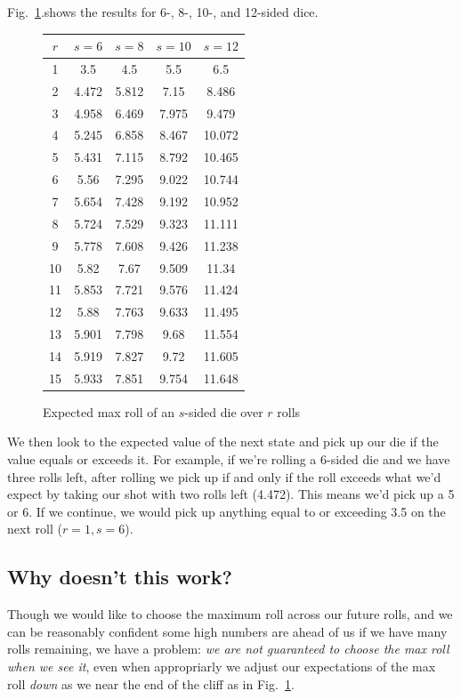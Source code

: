 \documentclass[11pt, oneside]{article} 	%
\begin{document}
 Fig.~\ref{fig:max-rolls}.shows the results for 6-, 8-, 10-, and 12-sided dice.

\begin{figure}[!htb]
\centering
\begin{tabular}{c | c c c c}
$r$ & $s=6$ & $s=8$  & $s=10$ & $s=12$  \\
\hline
1 & 3.5 & 4.5 & 5.5 & 6.5 \\
2 & 4.472 & 5.812 & 7.15 & 8.486 \\
3 & 4.958 & 6.469 & 7.975 & 9.479 \\
4 & 5.245 & 6.858 & 8.467 & 10.072 \\
5 & 5.431 & 7.115 & 8.792 & 10.465 \\
6 & 5.56 & 7.295 & 9.022 & 10.744 \\
7 & 5.654 & 7.428 & 9.192 & 10.952 \\
8 & 5.724 & 7.529 & 9.323 & 11.111 \\
9 & 5.778 & 7.608 & 9.426 & 11.238 \\
10 & 5.82 & 7.67 & 9.509 & 11.34 \\
11 & 5.853 & 7.721 & 9.576 & 11.424 \\
12 & 5.88 & 7.763 & 9.633 & 11.495 \\
13 & 5.901 & 7.798 & 9.68 & 11.554 \\
14 & 5.919 & 7.827 & 9.72 & 11.605 \\
15 & 5.933 & 7.851 & 9.754 & 11.648 \\
\end{tabular}
\caption{Expected max roll of an $s$-sided die over $r$ rolls}
\label{fig:max-rolls}
\end{figure}

We then look to the expected value of the next state and pick up our die if the value equals or exceeds it. For example, if we're rolling a 6-sided die and we have three rolls left, after rolling we pick up if and only if the roll exceeds what we'd expect by taking our shot with two rolls left (4.472). This means we'd pick up a 5 or 6. If we continue, we would pick up anything equal to or exceeding 3.5 on the next roll ($r=1, s=6$).

\subsection{Why doesn't this work?}

Though we would like to choose the maximum roll across our future rolls, and we can be reasonably confident some high numbers are ahead of us if we have many rolls remaining, we have a problem: \emph{we are not guaranteed to choose the max roll when we see it}, even when appropriarly we adjust our expectations of the max roll \emph{down} as we near the end of the cliff as in Fig.~\ref{fig:max-rolls}.
\end{document}
